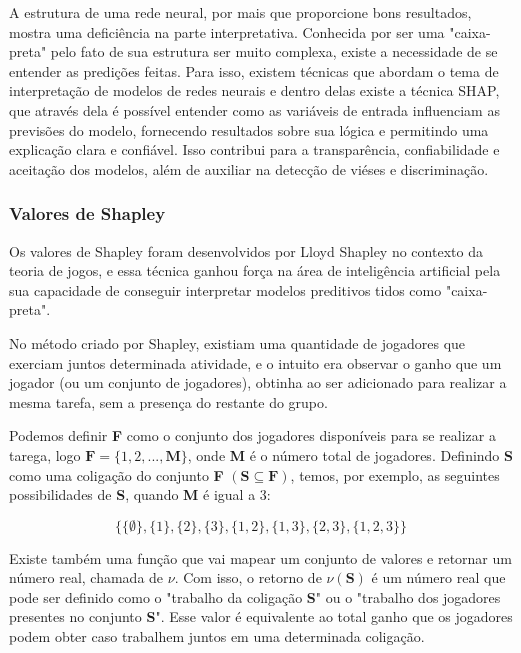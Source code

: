 A estrutura de uma rede neural, por mais que proporcione bons resultados, mostra uma deficiência na parte interpretativa. 
Conhecida por ser uma "caixa-preta" pelo fato de sua estrutura ser muito complexa, existe a necessidade de se entender 
as predições feitas.
Para isso, existem técnicas que abordam o tema de interpretação de modelos de redes neurais e dentro delas existe a
 técnica SHAP, que através dela é possível entender como as variáveis de entrada influenciam as previsões do modelo, 
 fornecendo resultados sobre sua lógica e permitindo uma explicação clara e confiável. Isso contribui para a 
 transparência, confiabilidade e aceitação dos modelos, além de auxiliar na detecção de viéses e discriminação. 

\subsubsection{Valores de Shapley}

Os valores de Shapley foram desenvolvidos por Lloyd Shapley \cite{shapley1953value} no contexto da teoria de jogos, 
e essa técnica ganhou   força na área de inteligência artificial pela sua capacidade de conseguir interpretar modelos
 preditivos tidos como "caixa-preta". 
 
 No método criado por Shapley, existiam uma quantidade de jogadores que exerciam
  juntos determinada atividade, e o intuito era observar o ganho que um jogador (ou um conjunto de jogadores), obtinha 
  ao ser adicionado para realizar a mesma tarefa, sem a presença do restante do grupo. 

Podemos definir \textbf{F} como o conjunto dos jogadores disponíveis para se realizar a tarega, 
logo $\textbf{F} = \{1,2,..., \textbf{M}\}$, onde \textbf{M} é o número total de jogadores.
Definindo \textbf{S} como uma coligação do conjunto \textbf{F} $(\textbf{S} \subseteq \textbf{F})$, temos, por exemplo, as seguintes possibilidades de \textbf{S}, quando \textbf{M} é igual a 3:

$$ \{\{\emptyset\},\{1\},\{2\},\{3\},\{1,2\},\{1,3\},\{2,3\},\{1,2,3\}\}$$

Existe também uma função que vai mapear um conjunto de valores e retornar um número real, chamada de $\nu$. Com isso, o retorno de $\nu(\textbf{S})$ é um número real que pode ser definido como 
o "trabalho da coligação \textbf{S}" ou o "trabalho dos jogadores presentes no conjunto \textbf{S}". Esse valor é equivalente ao total ganho que os jogadores podem obter caso trabalhem juntos em uma determinada coligação.

